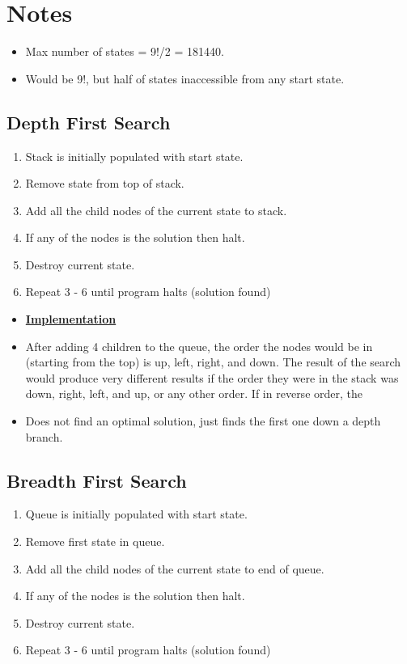 \documentclass[12pt]{article}
\begin{document}
\pagestyle{fancy}
\cfoot{\thepage}

\section{Notes}
\begin{itemize}
	\item Max number of states = 9!/2 = 181440.
	\item Would be 9!, but half of states inaccessible from any start state. 
\end{itemize}


\subsection{Depth First Search}
\begin{enumerate}
	\item Stack is initially populated with start state.
	\item Remove state from top of stack.
	\item Add all the child nodes of the current state to stack.
	\item If any of the nodes is the solution then halt.
	\item Destroy current state.
	\item Repeat 3 - 6 until program halts (solution found)	
\end{enumerate}

\begin{itemize}
	\item \textbf{\underline{Implementation}}
	\item After adding 4 children to the queue, the order the nodes would be in (starting from the top) is up, left, right, and down. The result of the search would produce very different results if the order they were in the stack was down, right, left, and up, or any other order. If in reverse order, the  	
	\item Does not find an optimal solution, just finds the first one down a depth branch.	
\end{itemize}

\subsection{Breadth First Search}
\begin{enumerate}
	\item Queue is initially populated with start state.
	\item Remove first state in queue.
	\item Add all the child nodes of the current state to end of queue.
	\item If any of the nodes is the solution then halt.
	\item Destroy current state.
	\item Repeat 3 - 6 until program halts (solution found)
\end{enumerate}
\end{document}
